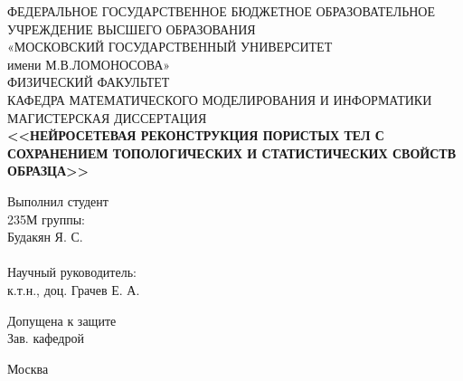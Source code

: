 \begin{titlepage} %
	
	\begin{center}
		\small{ФЕДЕРАЛЬНОЕ ГОСУДАРСТВЕННОЕ БЮДЖЕТНОЕ ОБРАЗОВАТЕЛЬНОЕ}\\ 
		УЧРЕЖДЕНИЕ ВЫСШЕГО ОБРАЗОВАНИЯ\\
		«МОСКОВСКИЙ ГОСУДАРСТВЕННЫЙ УНИВЕРСИТЕТ\\
		имени М.В.ЛОМОНОСОВА»\\
		\hfill \break
		ФИЗИЧЕСКИЙ ФАКУЛЬТЕТ \\
		\hfill \break
		КАФЕДРА МАТЕМАТИЧЕСКОГО МОДЕЛИРОВАНИЯ И ИНФОРМАТИКИ\\
		\hfill \break
		\hfill \break
		\hfill \break
		\hfill \break
		МАГИСТЕРСКАЯ ДИССЕРТАЦИЯ\\
		\hfill \break
		\textbf{<<НЕЙРОСЕТЕВАЯ РЕКОНСТРУКЦИЯ ПОРИСТЫХ ТЕЛ С СОХРАНЕНИЕМ ТОПОЛОГИЧЕСКИХ И СТАТИСТИЧЕСКИХ СВОЙСТВ ОБРАЗЦА>>}\\
	\end{center}
	
	\hfill \break

	\begin{flushright}
		Выполнил студент \\
		235М группы:\\
		Будакян Я. С.\\
		\underline{\hspace{3cm}}\\
		\hfill \break
		Научный руководитель: \\
		к.т.н., доц. Грачев Е. А.\\
		\underline{\hspace{3cm}}
	\end{flushright}
	
	\begin{flushleft}
		Допущена к защите\\
		Зав. кафедрой \underline{\hspace{3cm}}\\
	\end{flushleft}
	\hfill \break
	\begin{center}
		Москва \\
		\hfill {}
	\end{center}
	
	\thispagestyle{empty} %
	

\end{titlepage}  %